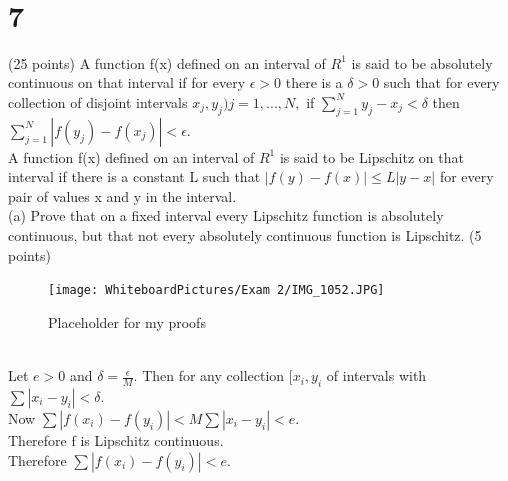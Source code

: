 \begin{figure}[h]\end{figure} 
\\
\newpage

\section*{7}
(25 points) A function f(x) defined on an interval of $R^1$ is said to be absolutely continuous on that interval if for every $ \epsilon>0 $ there is a $\delta>0$ such that for every collection of disjoint intervals $x_j,y_j) j=1,...,N,$ if $\sum_{j=1}^N y_j -x_j <\delta$ then $\sum_{j=1}^N|f(y_j)-f(x_j)|<\epsilon.$ \\ 
A function f(x) defined on an interval of $R^1$ is said to be Lipschitz on that interval if there is a constant L such that $|f(y)-f(x)| \leq L |y-x|$ for every pair of values x and y in the interval. \\ 






(a) Prove that on a fixed interval every Lipschitz function is absolutely continuous, but that not every absolutely continuous function is Lipschitz.  (5 points) 

\begin{figure}[h]\begin{center}\texttt{[image: WhiteboardPictures/Exam 2/IMG\_1052.JPG]}
\caption{Placeholder for my proofs} \label{fig:Euler_pic}\end{center}\end{figure} 
\\ 
Let $e>0$ and $\delta= \frac{\epsilon}{M}.$ Then for any collection ${[x_i,y_i}$ of intervals with $\sum |x_i -y_i|<\delta.$ \\ 
Now $\sum |f(x_i)-f(y_i)|<M \sum|x_i-y_i|<e. $ \\
Therefore f is Lipschitz continuous. \\ 
Therefore $\sum|f(x_i)-f(y_i)|<e.$ \\ 

